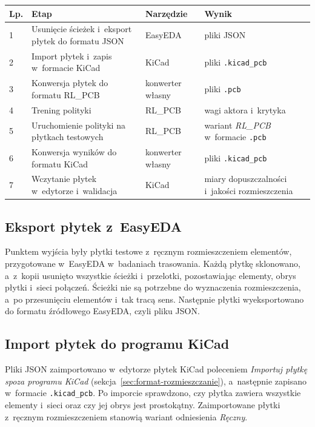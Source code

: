 \begin{table}[ht]
\label{tab:etapy-rl}
\centering\footnotesize%
\begin{tabular}{p{} p{} p{} p{}}
\toprule
Lp. & Etap & Narzędzie & Wynik \\
\midrule
1 & Usunięcie ścieżek i~eksport płytek do formatu JSON & EasyEDA & pliki JSON \\
\midrule
2 & Import płytek i~zapis w~formacie KiCad & KiCad & pliki \texttt{.kicad\_pcb} \\
\midrule
3 & Konwersja płytek do formatu RL\_PCB & konwerter własny & pliki \texttt{.pcb} \\
\midrule
4 & Trening polityki & RL\_PCB & wagi aktora i~krytyka \\
\midrule
5 & Uruchomienie polityki na płytkach testowych & RL\_PCB & wariant \emph{RL\_PCB}
  w~formacie \texttt{.pcb} \\
\midrule
6 & Konwersja wyników do formatu KiCad & konwerter własny & pliki \texttt{.kicad\_pcb} \\
\midrule
7 & Wczytanie płytek w~edytorze i~walidacja & KiCad & miary dopuszczalności
  i~jakości rozmieszczenia \\
\bottomrule
\end{tabular}
\end{table}

\subsection{Eksport płytek z~EasyEDA}
\label{sec:exp-rl-eksport}

Punktem wyjścia były płytki testowe z~ręcznym rozmieszczeniem elementów,
przygotowane w~EasyEDA w~badaniach trasowania. Każdą płytkę sklonowano, a~z~kopii
usunięto wszystkie ścieżki i~przelotki, pozostawiając elementy, obrys
płytki i~sieci połączeń. Ścieżki nie są potrzebne do wyznaczenia
rozmieszczenia, a~po przesunięciu elementów i~tak tracą sens. Następnie
płytki wyeksportowano do formatu źródłowego EasyEDA, czyli pliku JSON.

\subsection{Import płytek do programu KiCad}
\label{sec:exp-rl-kicad}

Pliki JSON zaimportowano w~edytorze płytek KiCad poleceniem
\emph{Importuj płytkę spoza programu KiCad}
(sekcja~\ref{sec:format-rozmieszczanie}), a~następnie zapisano w~formacie
\texttt{.kicad\_pcb}. Po imporcie sprawdzono, czy płytka zawiera wszystkie
elementy i~sieci oraz czy jej obrys jest prostokątny. Zaimportowane
płytki z~ręcznym rozmieszczeniem stanowią wariant odniesienia
\emph{Ręczny}.

